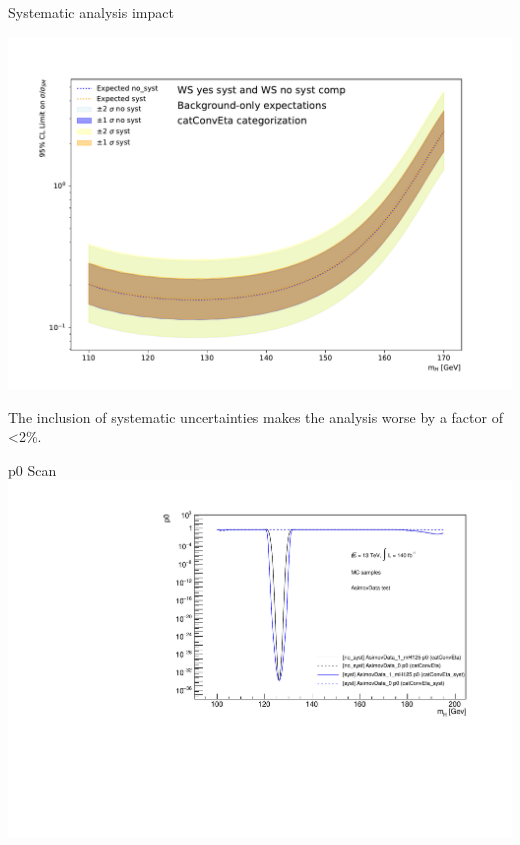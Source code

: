 \documentclass[10pt,UKenglish, leqno, xcolor = dvipsnames]{beamer}
\begin{document}
		\begin{frame}{Systematic analysis impact}
			\vfill
			\begin{center}
				\includegraphics[width=.7\textwidth]{Pres_Images/plot_syst.pdf}\\
			\end{center}
			The inclusion of systematic uncertainties makes the analysis worse by a factor of <2\%.
			\vfill
		\end{frame}
		
		\begin{frame}{p0 Scan}
			\centering
			\includegraphics[width=.9\textwidth]{Pres_Images/p0.pdf}
		\end{frame}
	
\end{document}
